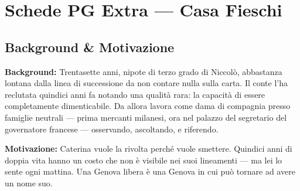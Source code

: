 
\chapter{Schede PG Extra --- Casa Fieschi}



\section*{Background \& Motivazione}

\begin{rulebox}{}
  \textbf{Background:} Trentasette anni, nipote di terzo grado di Niccolò,
  abbastanza lontana dalla linea di successione da non contare nulla
  sulla carta. Il conte l'ha reclutata quindici anni fa notando una qualità
  rara: la capacità di essere completamente dimenticabile. Da allora lavora
  come dama di compagnia presso famiglie neutrali — prima mercanti milanesi,
  ora nel palazzo del segretario del governatore francese — osservando,
  ascoltando, e riferendo.

  \medskip\noindent\textcolor{FieschiGreen}{\textbf{Motivazione:}} Caterina
  vuole la rivolta perché vuole smettere. Quindici anni di doppia vita hanno
  un costo che non è visibile nei suoi lineamenti — ma lei lo sente ogni
  mattina. Una Genova libera è una Genova in cui può tornare ad avere
  un nome suo.
\end{rulebox}

